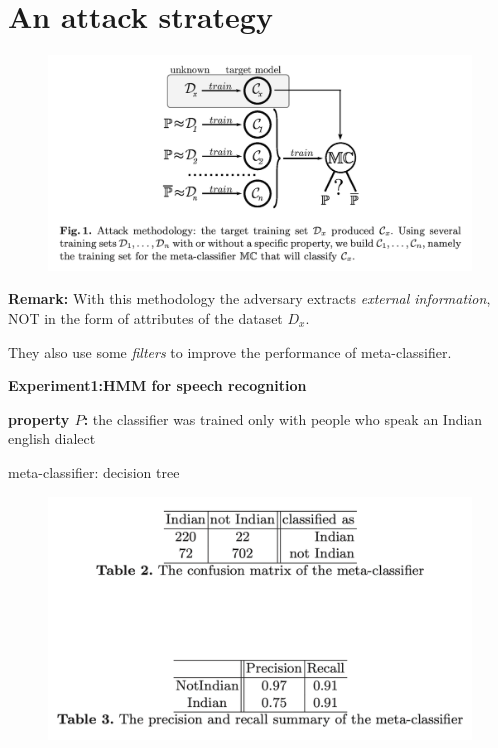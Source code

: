 \documentclass[11pt]{article}
\numberwithin{equation}{section}
\begin{document}
\section{An attack strategy}

\begin{figure}[H]
    \centering
    \includegraphics[width = 15cm]{figures/Attack_methodology.png}
    \label{fig:my_label}
\end{figure}

\textbf{Remark:} With this methodology the adversary extracts \textit{external information}, NOT in the form of attributes of the dataset $D_x$.

They also use some \textit{filters} to improve the performance of meta-classifier.

\textbf{Experiment1:HMM for speech recognition}

\textbf{property $P$:} the classifier was trained only with people who speak an Indian english dialect

meta-classifier: decision tree

\begin{figure}[H]
    \centering
    \includegraphics[width = 15cm]{figures/e1_non_filtered.png}
    \label{fig:my_label}
\end{figure}
\end{document}
